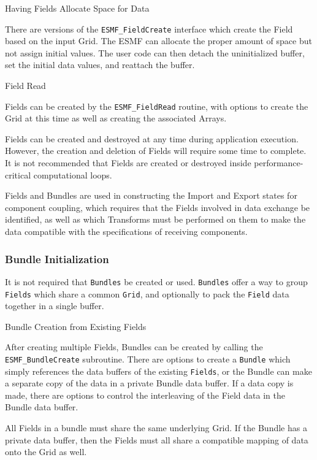 \begin{description}
\item{Having Fields Allocate Space for Data}

There are versions of the {\tt ESMF\_FieldCreate} interface
which create the Field based on the input Grid.  The ESMF
can allocate the proper amount of 
space but not assign initial values.  The user code
can then detach the uninitialized buffer, set the
initial data values, and reattach the buffer.

\item{Field Read}

Fields can be created by the {\tt ESMF\_FieldRead}
routine, with options to create the Grid at this time
as well as creating the associated Arrays.

\end{description}

Fields can be created and destroyed
at any time during application execution.  However, the creation
and deletion of Fields will require some time to complete.  
It is not recommended
that Fields are created or destroyed
inside performance-critical computational loops.

Fields and Bundles are used in constructing 
the Import and Export states for component coupling, 
which requires that the 
Fields involved in data exchange be identified, as well as
which Transforms must be performed on them to make the
data compatible with the specifications of
receiving components.  

\subsubsection{Bundle Initialization}

It is not required that {\tt Bundles} be created or used.
{\tt Bundles} offer a way to group {\tt Fields} which share a
common {\tt Grid}, and optionally to pack the {\tt Field} data
together in a single buffer.

\begin{description}

\item{Bundle Creation from Existing Fields}

After creating multiple Fields, Bundles can be created
by calling the {\tt ESMF\_BundleCreate} subroutine.  There are
options to create a {\tt Bundle} which simply references
the data buffers of the existing {\tt Fields}, 
or the Bundle can make a separate copy of the data in a private 
Bundle data buffer.  If a data copy is made, there are options to
control the interleaving of the Field data in the Bundle data buffer.

All Fields in a bundle must share the same underlying Grid.
If the Bundle has a private data buffer, then the Fields must
all share a compatible mapping of data onto the Grid as well.

\end{description}

